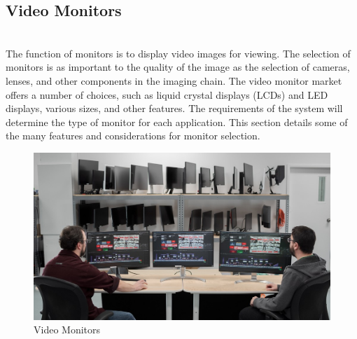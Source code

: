\documentclass[12pt,fleqn]{book} %
\begin{document}
\subsection{Video Monitors}
\\The function of monitors is to display video images for viewing. The selection of monitors is as important to the quality of the image as the selection of cameras, lenses, and other components in the imaging chain. The video monitor market offers a number of choices, such as liquid crystal displays (LCDs) and LED displays, various sizes, and other features. The requirements of the system will determine the type of monitor for each application. This section details some of the many features and considerations for monitor selection. 
                        \begin{figure}[!h]
    \centering
    \includegraphics[width=0.5\linewidth]{c 12.jpg}
    \caption{Video Monitors}
    \label{fig:c 12}
    \end{figure}
\end{document}

